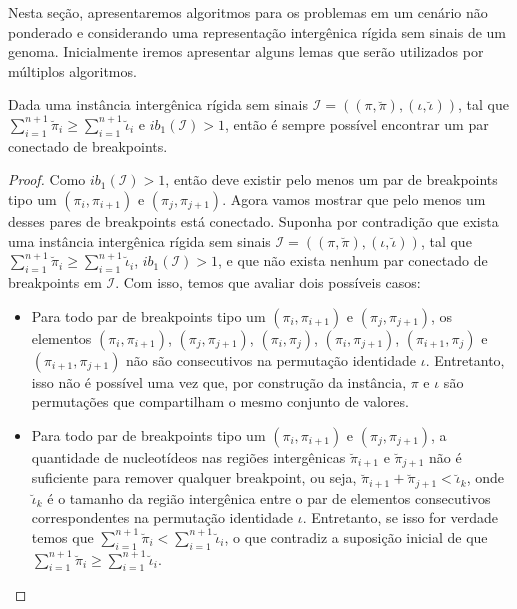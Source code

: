 Nesta seção, apresentaremos algoritmos para os problemas em um cenário não ponderado e considerando uma representação intergênica rígida sem sinais de um genoma. Inicialmente iremos apresentar alguns lemas que serão utilizados por múltiplos algoritmos. 

\begin{lemma}\label{lemma:WYEZMYTM}
Dada uma instância intergênica rígida sem sinais $\mathcal{I}=((\pi,\breve\pi),(\iota,\breve\iota))$, tal que $\sum_{i=1}^{n+1}\breve\pi_i \ge \sum_{i=1}^{n+1}\breve\iota_i$ e $ib_1(\mathcal{I}) > 1$, então é sempre possível encontrar um par conectado de breakpoints.
\end{lemma}
\begin{proof}
Como $ib_1(\mathcal{I}) > 1$, então deve existir pelo menos um par de breakpoints tipo um $(\pi_i,\pi_{i+1})$ e $(\pi_j,\pi_{j+1})$. Agora vamos mostrar que pelo menos um desses pares de breakpoints está conectado. Suponha por contradição que exista uma instância intergênica rígida sem sinais $\mathcal{I}=((\pi,\breve\pi),(\iota,\breve\iota))$, tal que $\sum_{i=1}^{n+1}\breve\pi_i \ge \sum_{i=1}^{n+1}\breve\iota_i$, $ib_1(\mathcal{I}) > 1$, e que não exista nenhum par conectado de breakpoints em $\mathcal{I}$. Com isso, temos que avaliar dois possíveis casos:
\begin{itemize}
  \item Para todo par de breakpoints tipo um $(\pi_i,\pi_{i+1})$ e $(\pi_j,\pi_{j+1})$, os elementos $(\pi_i,\pi_{i+1})$, $(\pi_j,\pi_{j+1})$, $(\pi_i,\pi_{j})$, $(\pi_i,\pi_{j+1})$, $(\pi_{i+1},\pi_{j})$ e $(\pi_{i+1},\pi_{j+1})$ não são consecutivos na permutação identidade $\iota$. Entretanto, isso não é possível uma vez que, por construção da instância, $\pi$ e $\iota$ são permutações que compartilham o mesmo conjunto de valores.
  \item Para todo par de breakpoints tipo um $(\pi_i,\pi_{i+1})$ e $(\pi_j,\pi_{j+1})$, a quantidade de nucleotídeos nas regiões intergênicas $\breve\pi_{i+1}$ e $\breve\pi_{j+1}$ não é suficiente para remover qualquer breakpoint, ou seja, $\breve\pi_{i+1} + \breve\pi_{j+1} < \breve\iota_k$, onde $\breve\iota_k$ é o tamanho da região intergênica entre o par de elementos consecutivos correspondentes na permutação identidade $\iota$. Entretanto, se isso for verdade temos que $\sum_{i=1}^{n+1}\breve\pi_i < \sum_{i=1}^{n+1}\breve\iota_i$, o que contradiz a suposição inicial de que $\sum_{i=1}^{n+1}\breve\pi_i \ge \sum_{i=1}^{n+1}\breve\iota_i$.
\end{itemize}
\end{proof}

